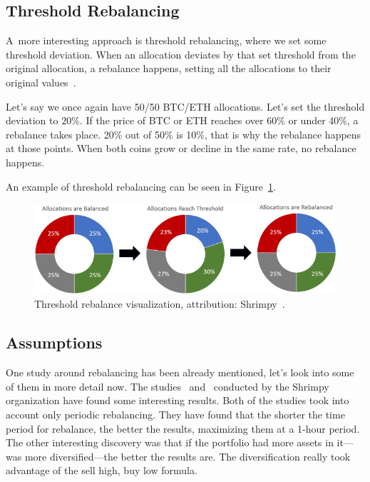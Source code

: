 \subsection*{Threshold Rebalancing}
A~more interesting approach is threshold rebalancing, where we set some threshold deviation. When an allocation deviates by that set threshold from the original allocation, a rebalance happens, setting all the allocations to their original values~\cite{portfolio-rebalancing}.

Let's say we once again have 50/50 BTC/ETH allocations. Let's set the threshold deviation to $20\%$. If the price of BTC or ETH reaches over 60\% or under 40\%, a rebalance takes place. 20\% out of 50\% is 10\%, that is why the rebalance happens at those points. When both coins grow or decline in the same rate, no rebalance happens.

An example of threshold rebalancing can be seen in Figure~\ref{threshold-rebalance-figure}.

\begin{figure}[!hbt]
    \centering
    \includegraphics[width=\columnwidth]{figures/threshold-rebalance.png}
    \caption{Threshold rebalance visualization, attribution: Shrimpy~\cite{portfolio-rebalancing}.}
    \label{threshold-rebalance-figure}
\end{figure}

\subsection*{Assumptions}
\label{rebalance-assumptions}
One study around rebalancing has been already mentioned, let's look into some of them in more detail now. The studies~\cite{portfolio-diversity} and~\cite{diversify-perform-better} conducted by the Shrimpy organization have found some interesting results. Both of the studies took into account only periodic rebalancing. They have found that the shorter the time period for rebalance, the better the results, maximizing them at a 1-hour period. The other interesting discovery was that if the portfolio had more assets in it---was more diversified---the better the results are. The diversification really took advantage of the sell high, buy low formula.

